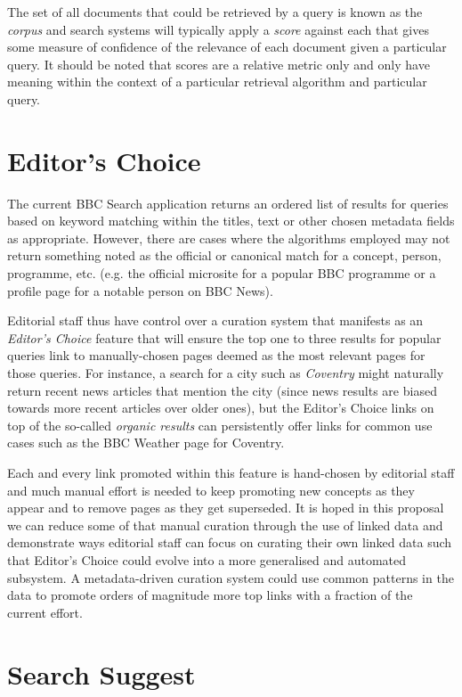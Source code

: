 The set of all documents that could be retrieved by a query is known as the
\emph{corpus} and search systems will typically apply a \emph{score} against
each that gives some measure of confidence of the relevance of each document
given a particular query. It should be noted that scores are a relative
metric only and only have meaning within the context of a particular
retrieval algorithm and particular query.

\section{Editor's Choice}

The current BBC Search application returns an ordered list of results
for queries based on keyword matching within the titles, text or other
chosen metadata fields as appropriate. However, there are cases where
the algorithms employed may not return something noted as the official
or canonical match for a concept, person, programme, etc. (e.g. the
official microsite for a popular BBC programme or a profile page for
a notable person on BBC News).

Editorial staff thus have control over a curation system that manifests
as an \emph{Editor's Choice} feature that will ensure the top one to three
results for popular queries link to manually-chosen pages deemed as the most
relevant pages for those queries. For instance, a search for a city such
as \emph{Coventry} might naturally return recent news articles that mention the
city (since news results are biased towards more recent articles over older
ones), but the Editor's Choice links on top of the so-called \emph{organic
results} can persistently offer links for common use cases such as
the BBC Weather page for Coventry.

Each and every link promoted within this feature is hand-chosen by editorial
staff and much manual effort is needed to keep promoting new concepts
as they appear and to remove pages as they get superseded. It is hoped
in this proposal we can reduce some of that manual curation through the use
of linked data and demonstrate ways editorial staff can focus on curating
their own linked data such that Editor's Choice could evolve into a more
generalised and automated subsystem. A metadata-driven curation system
could use common patterns in the data to promote orders of magnitude more
top links with a fraction of the current effort.

\section{Search Suggest}

